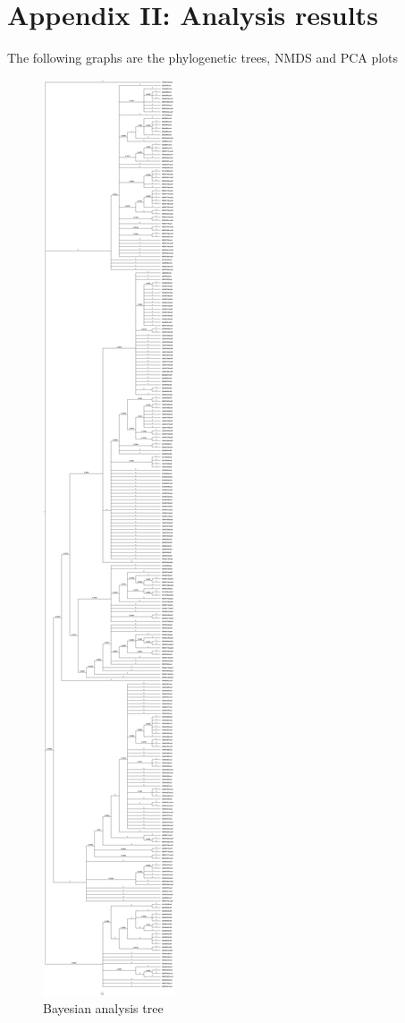 \chapter{Appendix II: Analysis results}
\label{appendixii:analysisresults}

The following graphs are the phylogenetic trees, NMDS and PCA plots

\begin{figure}[htbp]
\centering
\includegraphics[keepaspectratio,width=\textwidth,height=0.75\textheight]{images/mcmc.jpg}
\caption{Bayesian analysis tree}
\end{figure}

